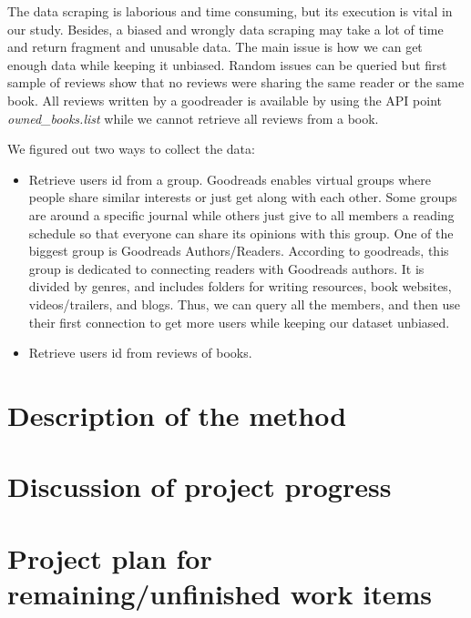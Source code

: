 \documentclass[11pt]{article}
\begin{document}
The data scraping is laborious and time consuming, but its execution is vital in our study. Besides, a biased and wrongly data scraping may take a lot of time and return fragment and unusable data.
The main issue is how we can get enough data while keeping it unbiased.
Random issues can be queried but first sample of reviews show that no reviews were sharing the same reader or the same book. All reviews written by a goodreader is available by using the API point \textit{owned\_books.list} while we cannot retrieve all reviews from a book.


We figured out two ways to collect the data:
\begin{itemize}
\item Retrieve users id from a group.\newline
Goodreads enables virtual groups where people share similar interests or just get along with each other. Some groups are around a specific journal while others just give to all members a reading schedule so that everyone can share its opinions with this group. One of the biggest group is Goodreads Authors/Readers. According to goodreads, this group is dedicated to connecting readers with Goodreads authors. It is divided by genres, and includes folders for writing resources, book websites, videos/trailers, and blogs. Thus, we can query all the members, and then use their first connection to get more users while keeping our dataset unbiased.
\item Retrieve users id from reviews of books.\newline

\end{itemize}



\section{Description of the method}
\section{Discussion of project progress}
\section{Project plan for remaining/unfinished work items}
\end{document}
